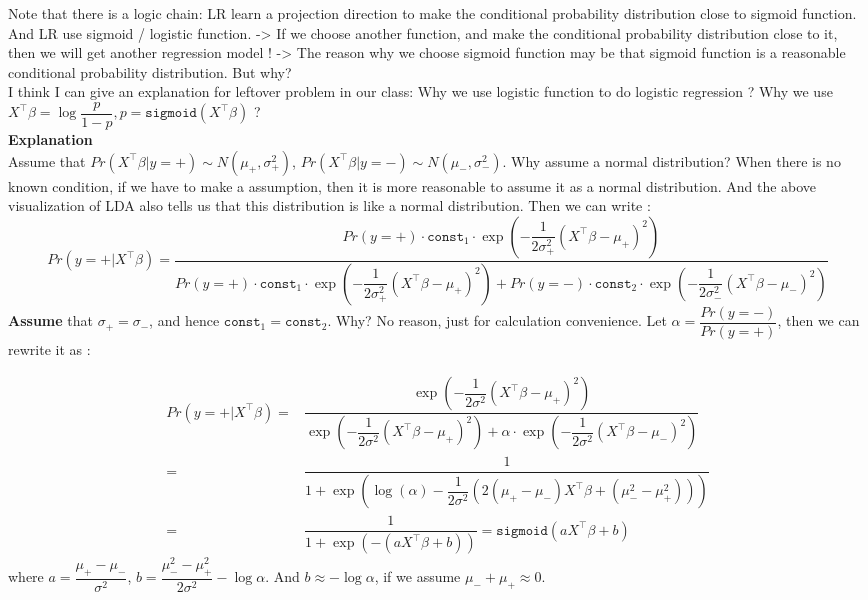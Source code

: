 \documentclass{article}
\begin{document}
Note that there is a logic chain: LR learn a projection direction to make the conditional probability distribution close to sigmoid function. And LR use sigmoid / logistic function. -> If we choose another function, and make the conditional probability 
distribution close to it, then we will get another regression model ! -> The reason why we choose sigmoid function may be that sigmoid function is a reasonable conditional probability distribution. But why? \\

I think I can give an explanation for leftover problem in our class: Why we use logistic function to do logistic regression ? 
Why we use $X^\top\beta = \log\dfrac{p}{1-p}, p=\mathtt{sigmoid}(X^\top\beta)$ ?
\\
\textbf{Explanation}\\
Assume that $Pr(X^\top\beta|y=+)\sim N(\mu_+, \sigma_+^2)$, $Pr(X^\top\beta|y=-)\sim N(\mu_-, \sigma_-^2)$. Why assume a normal distribution? When there is no known condition, if we have to make a assumption, then it is more reasonable to assume it as a normal distribution. And the above visualization of LDA also tells us that 
this distribution is like a normal distribution. Then we can write :
\begin{equation}
    Pr(y=+|X^\top\beta)=\dfrac{Pr(y=+)\cdot \mathtt{const}_1\cdot \exp\left(-\dfrac{1}{2\sigma_+^2}(X^\top\beta-\mu_+)^2\right)}{Pr(y=+)\cdot \mathtt{const}_1\cdot \exp\left(-\dfrac{1}{2\sigma_+^2}(X^\top\beta-\mu_+)^2\right)+Pr(y=-)\cdot \mathtt{const}_2\cdot \exp\left(-\dfrac{1}{2\sigma_-^2}(X^\top\beta-\mu_-)^2\right)}
\end{equation} 
\textbf{Assume} that $\sigma_+ = \sigma_-$, and hence $\mathtt{const}_1 = \mathtt{const}_2$. Why? No reason, just for calculation convenience. Let $\alpha = \dfrac{Pr(y=-)}{Pr(y=+)}$, then we can rewrite it as :
\begin{spacing}{2.0}
\begin{equation}
    \begin{array}{rl}
        Pr(y=+|X^\top\beta)=&\dfrac{\exp\left(-\dfrac{1}{2\sigma^2}(X^\top\beta-\mu_+)^2\right)}{\exp\left(-\dfrac{1}{2\sigma^2}(X^\top\beta-\mu_+)^2\right) + \alpha\cdot\exp\left(-\dfrac{1}{2\sigma^2}(X^\top\beta-\mu_-)^2\right)}\\
        =&\dfrac{1}{1+\exp\left(\log(\alpha) - \dfrac{1}{2\sigma^2}\left(2(\mu_+-\mu_-)X^\top\beta+(\mu_-^2-\mu_+^2)\right)\right)}\\
        =&\dfrac{1}{1+\exp(-(aX^\top\beta+b))} = \mathtt{sigmoid}(aX^\top\beta+b)
    \end{array}
\end{equation}
where $a=\dfrac{\mu_+-\mu_-}{\sigma^2}$, $b=\dfrac{\mu_-^2-\mu_+^2}{2\sigma^2}-\log\alpha$. And $b \approx -\log \alpha$, if we assume $\mu_- + \mu_+ \approx 0$.
\end{spacing}
\end{document}
